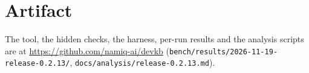 \documentclass[conference]{IEEEtran}
\newif\ifanon
\begin{document}
\section*{Artifact}
\ifanon Withheld for review.\else The tool, the hidden checks, the harness, per-run results and the analysis scripts are at
\url{https://github.com/namiq-ai/devkb} (\texttt{bench/results/2026-11-19-release-0.2.13/}, \texttt{docs/analysis/release-0.2.13.md}).\fi



\end{document}
